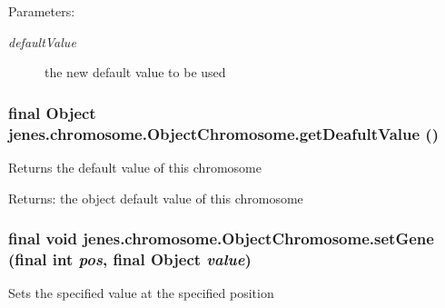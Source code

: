 \begin{Desc}
\item[Parameters:]
\begin{description}
\item[{\em defaultValue}]the new default value to be used \end{description}
\end{Desc}
\hypertarget{classjenes_1_1chromosome_1_1_object_chromosome_ea3da542f5b0d9c3300dc76cec3385f9}{
\subsubsection[getDeafultValue]{\setlength{\rightskip}{0pt plus 5cm}final Object jenes.chromosome.ObjectChromosome.getDeafultValue ()}}
\label{classjenes_1_1chromosome_1_1_object_chromosome_ea3da542f5b0d9c3300dc76cec3385f9}


Returns the default value of this chromosome 

\begin{Desc}
\item[Returns:]the object default value of this chromosome \end{Desc}
\hypertarget{classjenes_1_1chromosome_1_1_object_chromosome_e68b9a0568dfc16f4f543438e54ac0ea}{
\subsubsection[setGene]{\setlength{\rightskip}{0pt plus 5cm}final void jenes.chromosome.ObjectChromosome.setGene (final int {\em pos}, \/  final Object {\em value})}}
\label{classjenes_1_1chromosome_1_1_object_chromosome_e68b9a0568dfc16f4f543438e54ac0ea}


Sets the specified value at the specified position 

